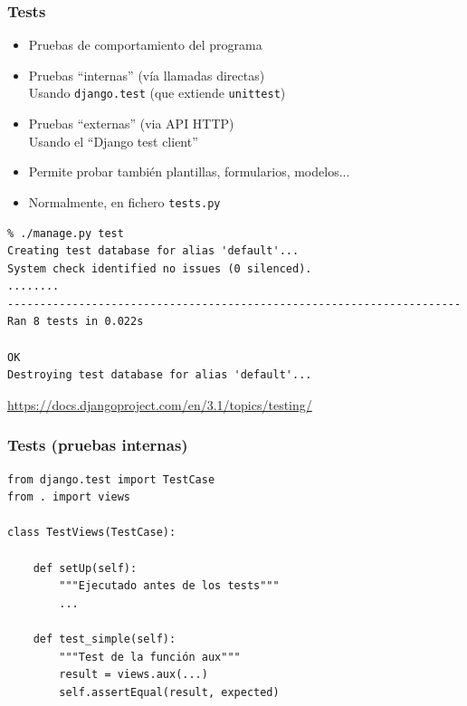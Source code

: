 
\begin{frame}[fragile]
\frametitle{Tests}

\begin{itemize}
\item Pruebas de comportamiento del programa
\item Pruebas ``internas'' (vía llamadas directas) \\
  Usando \verb|django.test| (que extiende \verb|unittest|)
\item Pruebas ``externas'' (via API HTTP) \\
  Usando el ``Django test client''
\item Permite probar también plantillas, formularios, modelos...
\item Normalmente, en fichero \verb|tests.py|
\end{itemize}

{\small
\begin{verbatim}
% ./manage.py test
Creating test database for alias 'default'...
System check identified no issues (0 silenced).
........
----------------------------------------------------------------------
Ran 8 tests in 0.022s

OK
Destroying test database for alias 'default'...
\end{verbatim}
}

\begin{flushright}
\url{https://docs.djangoproject.com/en/3.1/topics/testing/}
\end{flushright}

\end{frame}


\begin{frame}[fragile]
\frametitle{Tests (pruebas internas)}

{\small
\begin{verbatim}
from django.test import TestCase
from . import views

class TestViews(TestCase):

    def setUp(self):
        """Ejecutado antes de los tests"""
        ...

    def test_simple(self):
        """Test de la función aux"""
        result = views.aux(...)
        self.assertEqual(result, expected)
\end{verbatim}
}

\end{frame}

